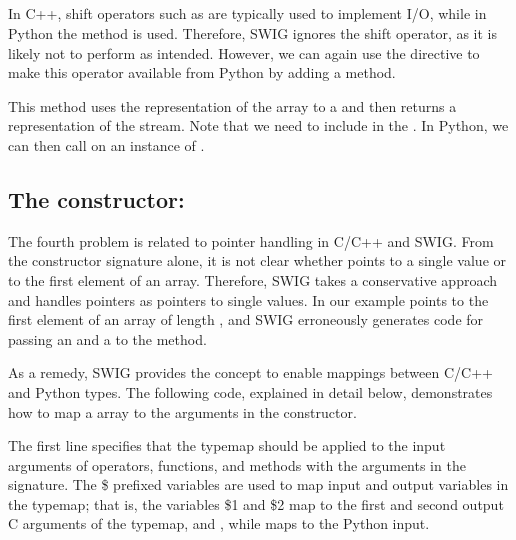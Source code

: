 \subsection{}%
In C++, shift operators such as  are typically used
to implement I/O, while in Python the  method is used.
Therefore, SWIG ignores the shift operator, as it is likely not to perform
as intended.  However, we can again use the  directive to
make this operator available from Python by adding a 
method.
This method uses the  %
representation of the array to a  and then
returns a  representation of the stream.  Note that we
need to include  in the .  In Python,
we can then call  on an instance of .

\subsection{The constructor: }
The fourth problem is related to pointer handling in C/C++ and SWIG. From
the constructor signature alone, it is not clear whether  points to a single value or to the first element of an array.
Therefore, SWIG takes a conservative approach and handles pointers as
pointers to single values. In our example  points to
the first element of an array of length , and SWIG erroneously
generates code for passing an  and a  to the method.

As a remedy, SWIG provides the  concept to enable mappings
between C/C++ and Python types. The following code, explained in detail
below, demonstrates how to map a \numpy array to the  arguments in the constructor.
The first line specifies that the typemap should be applied to the
input  arguments of operators, functions, and methods with the
 arguments in the signature.  The \$ prefixed
variables are used to map input and output variables in the typemap;
that is, the variables \$1 and \$2 map to the first and second output C
arguments of the typemap,  and , while 
maps to the Python input.

